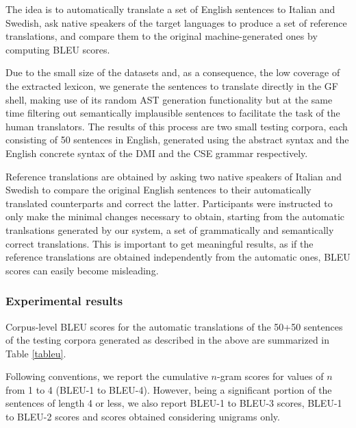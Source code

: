 \documentclass[11pt]{article}
\begin{document}
The idea is to automatically translate a set of English sentences to Italian and Swedish, ask native speakers of the target languages to produce a set of reference translations, and compare them to the original machine-generated ones by computing BLEU scores.

Due to the small size of the datasets and, as a consequence, the low coverage of the extracted lexicon, we generate the sentences to translate directly in the GF shell, making use of its random AST generation functionality but at the same time filtering out semantically implausible sentences to facilitate the task of the human translators.
The results of this process are two small testing corpora, each consisting of 50 sentences in English, generated using the abstract syntax and the English concrete syntax of the DMI and the CSE grammar respectively. 

Reference translations are obtained by asking two native speakers of Italian and Swedish to compare the original English sentences to their automatically translated counterparts and correct the latter.
Participants were instructed to only make the minimal changes necessary to obtain, starting from the automatic tranlsations generated by our system, a set of grammatically and semantically correct translations. 
This is important to get meaningful results, as if the reference translations are obtained independently from the automatic ones, BLEU scores can easily become misleading.

\subsubsection{Experimental results} 
Corpus-level BLEU scores for the automatic translations of the 50+50 sentences of the testing corpora generated as described in the above are summarized in Table \ref{tableu}.

Following conventions, we report the cumulative $n$-gram scores for values of $n$ from 1 to 4 (BLEU-1 to BLEU-4). 
However, being a significant portion of the sentences of length 4 or less, we also report BLEU-1 to BLEU-3 scores, BLEU-1 to BLEU-2 scores and scores obtained considering unigrams only. 
\end{document}
